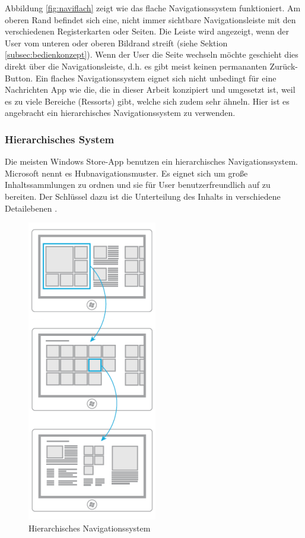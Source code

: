 \documentclass[12pt,a4paper]{scrartcl}
\begin{document}
Abbildung \ref{fig:naviflach} zeigt wie das flache Navigationssystem funktioniert. Am oberen Rand befindet sich eine, nicht immer sichtbare Navigationsleiste mit den verschiedenen Registerkarten oder Seiten. Die Leiste wird angezeigt, wenn der User vom unteren oder oberen Bildrand streift (siehe Sektion \ref{subsec:bedienkonzept}). Wenn der User die Seite wechseln möchte geschieht dies  direkt über die Navigationsleiste, d.h. es gibt meist keinen permananten Zurück-Button. Ein flaches Navigationssystem eignet sich nicht unbedingt für eine Nachrichten App wie die, die in dieser Arbeit konzipiert und umgesetzt ist, weil es zu viele Bereiche (Ressorts) gibt, welche sich zudem sehr ähneln. Hier ist es angebracht ein hierarchisches Navigationssystem zu verwenden.    



\subsubsection{Hierarchisches System}
\label{subsubsec:hierachischessystem}
Die meisten Windows Store-App benutzen ein hierarchisches Navigationssystem. Microsoft nennt es Hubnavigationsmuster. Es eignet sich um große Inhaltssammlungen zu ordnen und sie für User benutzerfreundlich auf zu bereiten. Der Schlüssel dazu ist die Unterteilung des Inhalts in verschiedene Detailebenen \citep{MicrosoftNavidesign2013}.

\begin{figure}[h]	
	\centering
	\includegraphics[scale=1]{Bilder/Abbildungen/ms_navigation_hierarchie} 
	\caption{Hierarchisches Navigationssystem \protect\citep{MicrosoftNavidesign2013}}
	\label{fig:navihierarchisch}
\end{figure}
\end{document}
